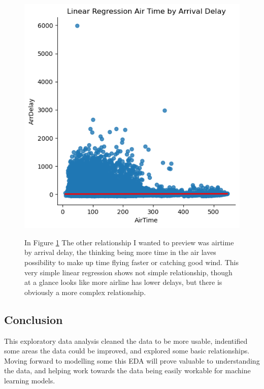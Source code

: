 \documentclass[a4paper,12pt]{article}
\begin{document}
\begin{figure}
    \centering
    \includegraphics*[]{../../img/airtime_by_delay.png}
    \caption[]{}
    \label{fig:lm_airtimebydelay}
    In Figure \ref{fig:lm_airtimebydelay} The other relationship I wanted to preview was airtime by arrival delay, the thinking being more time in the air laves possibility 
    to make up time flying faster or catching good wind. This very simple linear regression shows not simple relationship, though at a glance looks like more airline has lower delays, but there is obviously a more complex relationship.
\end{figure}

\break
\subsection{Conclusion}

This exploratory data analysis cleaned the data to be more usable, indentified some areas the data could be improved, and explored some basic relationships.
Moving forward to modelling some this EDA will prove valuable to understanding the data, and helping work towards the data being easily workable for machine learning models.
\end{document}
